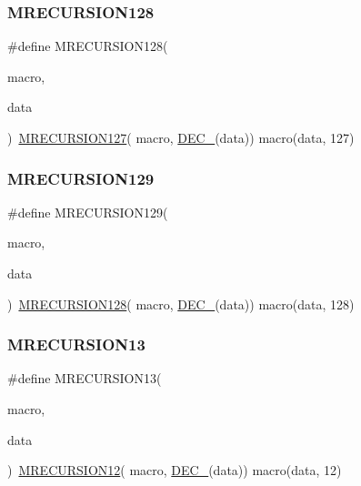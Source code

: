 \subsubsection{\texorpdfstring{MRECURSION128}{MRECURSION128}}
{\footnotesize\ttfamily \#define M\+R\+E\+C\+U\+R\+S\+I\+O\+N128(\begin{DoxyParamCaption}\item[{}]{macro,  }\item[{}]{data }\end{DoxyParamCaption})~\mbox{\hyperlink{group__group__sam0__utils__mrecursion_gaea7381171385b03934547affe3c25d40}{M\+R\+E\+C\+U\+R\+S\+I\+O\+N127}}(  macro, \mbox{\hyperlink{group__group__sam0__utils__mrecursion_ga1d23d683797679dca8c3512a54a5dcae}{D\+E\+C\+\_\+}}(data))   macro(data, 127)}

\mbox{\label{group__group__sam0__utils__mrecursion_gad2b53c67fce0357e4fe34a21d831a002}} 
\subsubsection{\texorpdfstring{MRECURSION129}{MRECURSION129}}
{\footnotesize\ttfamily \#define M\+R\+E\+C\+U\+R\+S\+I\+O\+N129(\begin{DoxyParamCaption}\item[{}]{macro,  }\item[{}]{data }\end{DoxyParamCaption})~\mbox{\hyperlink{group__group__sam0__utils__mrecursion_ga5c2aeada031c5a2154dcff155a117fb8}{M\+R\+E\+C\+U\+R\+S\+I\+O\+N128}}(  macro, \mbox{\hyperlink{group__group__sam0__utils__mrecursion_ga1d23d683797679dca8c3512a54a5dcae}{D\+E\+C\+\_\+}}(data))   macro(data, 128)}

\mbox{\label{group__group__sam0__utils__mrecursion_gac0cd2495b5a9a8b69ed7f701d5f15a47}} 
\subsubsection{\texorpdfstring{MRECURSION13}{MRECURSION13}}
{\footnotesize\ttfamily \#define M\+R\+E\+C\+U\+R\+S\+I\+O\+N13(\begin{DoxyParamCaption}\item[{}]{macro,  }\item[{}]{data }\end{DoxyParamCaption})~\mbox{\hyperlink{group__group__sam0__utils__mrecursion_ga2729e6d7bf9ad170f0b715d38b75e5b8}{M\+R\+E\+C\+U\+R\+S\+I\+O\+N12}}(  macro, \mbox{\hyperlink{group__group__sam0__utils__mrecursion_ga1d23d683797679dca8c3512a54a5dcae}{D\+E\+C\+\_\+}}(data))   macro(data, 12)}

